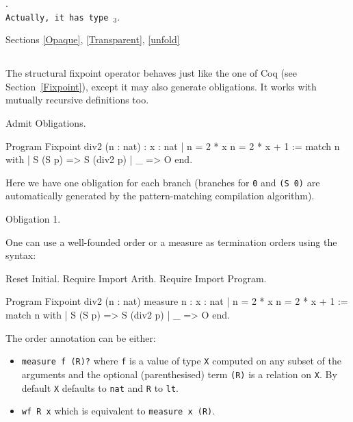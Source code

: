 \begin{ErrMsgs}
\item {}.\\
    \texttt{Actually, it has type {\term$_3$}}.
\end{ErrMsgs}

\SeeAlso Sections \ref{Opaque}, \ref{Transparent}, \ref{unfold}

\subsection{}

The structural fixpoint operator behaves just like the one of Coq
(see Section~\ref{Fixpoint}), except it may also generate obligations.
It works with mutually recursive definitions too.

\begin{coq_eval}
Admit Obligations.
\end{coq_eval}
\begin{coq_example}
Program Fixpoint div2 (n : nat) : { x : nat | n = 2 * x \/ n = 2 * x + 1 } :=
  match n with
  | S (S p) => S (div2 p)
  | _ => O
  end.
\end{coq_example}

Here we have one obligation for each branch (branches for \verb:0: and \verb:(S 0): are
automatically generated by the pattern-matching compilation algorithm).
\begin{coq_example}
  Obligation 1.
\end{coq_example}

One can use a well-founded order or a measure as termination orders using the syntax:
\begin{coq_eval}
Reset Initial.
Require Import Arith.
Require Import Program.
\end{coq_eval}
\begin{coq_example*}
Program Fixpoint div2 (n : nat) {measure n} :
  { x : nat | n = 2 * x \/ n = 2 * x + 1 } :=
  match n with
  | S (S p) => S (div2 p)
  | _ => O
  end.
\end{coq_example*}

The order annotation can be either:
\begin{itemize}
\item {\tt measure f (R)?} where {\tt f} is a value of type {\tt X}
  computed on any subset of the arguments and the optional
  (parenthesised) term {\tt (R)} is a relation
  on {\tt X}. By default {\tt X} defaults to {\tt nat} and {\tt R} to
  {\tt lt}.
\item {\tt wf R x} which is equivalent to {\tt measure x (R)}.
\end{itemize}

